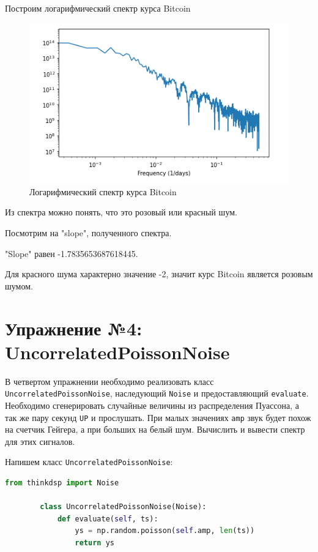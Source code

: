\documentclass[a4paper, 14pt]{extarticle}
\begin{document}
    Построим логарифмический спектр курса Bitcoin

    \begin{figure}[H]
        \centering
        \includegraphics[width=0.8\linewidth]{bitcoin_spectrum}
        \caption{Логарифмический спектр курса Bitcoin}
        \label{fig:bitcoin_spectrum}
    \end{figure}

    Из спектра можно понять, что это розовый или красный шум.

    Посмотрим на "slope", полученного спектра.

    "Slope" равен -1.7835653687618445.

    Для красного шума характерно значение -2, значит курс Bitcoin является розовым шумом.

    \newpage


    \section{Упражнение №4: UncorrelatedPoissonNoise}
    \label{sec:4}

    В четвертом упражнении необходимо реализовать класс \texttt{UncorrelatedPoissonNoise}, наследующий \texttt{Noise} и предоставляющий \texttt{evaluate}.
    Необходимо сгенерировать случайные величины из распределения Пуассона, а так же пару секунд \texttt{UP} и прослушать.
    При малых значениях \texttt{amp} звук будет похож на счетчик Гейгера, а при больших на белый шум.
    Вычислить и вывести спектр для этих сигналов.

    Напишем класс \texttt{UncorrelatedPoissonNoise}:

    \begin{lstlisting}[language=Python, caption= Класс UncorrelatedPoissonNoise, label={lst:uncorrelated_poisson_noise}]
        from thinkdsp import Noise

        class UncorrelatedPoissonNoise(Noise):
            def evaluate(self, ts):
                ys = np.random.poisson(self.amp, len(ts))
                return ys
    \end{lstlisting}
\end{document}
